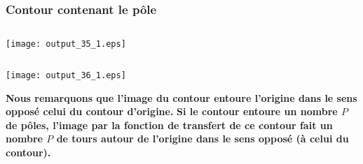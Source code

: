 \subsubsection{Contour contenant le pôle}
\begin{tcolorbox}[breakable, size=fbox, boxrule=1pt, 
    pad at break*=1mm,colback=cellbackground, colframe=cellborder]
\inputminted{python}{codes/python/annexe_cauchy_cellule15.py}
\end{tcolorbox}
\begin{center}
    \texttt{[image: output\_35\_1.eps]}
\end{center}
\begin{tcolorbox}[breakable, size=fbox, boxrule=1pt, 
    pad at break*=1mm,colback=cellbackground, colframe=cellborder]
\inputminted{python}{codes/python/annexe_cauchy_cellule16.py}
\end{tcolorbox}
\begin{center}
    \texttt{[image: output\_36\_1.eps]}
\end{center}
\textbf{Nous remarquons que l'image du contour entoure l'origine dans le
sens opposé celui du contour d'origine.} 
\textbf{Si le contour entoure un nombre \(P\) de pôles, l'image par la
fonction de transfert de ce contour fait un nombre \(P\) de tours autour
de l'origine dans le sens opposé (à celui du contour).} 
